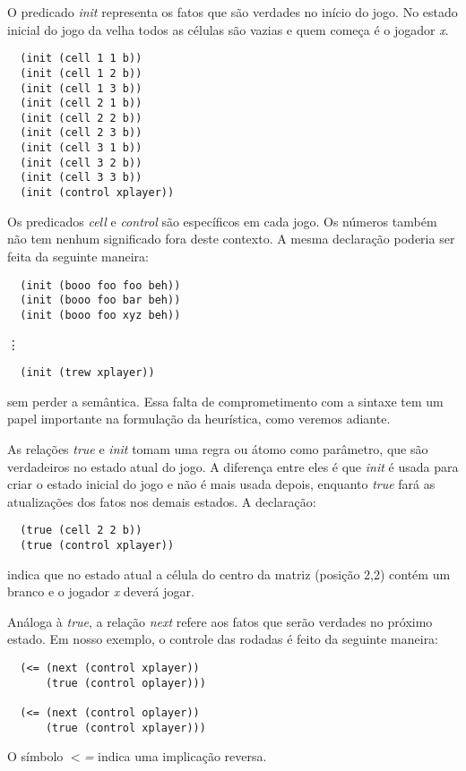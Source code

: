 O predicado {\it init} representa os fatos que são verdades no início do jogo.
No estado inicial do jogo da velha todos as células são vazias e quem começa é o
jogador {\it x}.
\begin{verbatim}
  (init (cell 1 1 b))
  (init (cell 1 2 b))
  (init (cell 1 3 b))
  (init (cell 2 1 b))
  (init (cell 2 2 b))
  (init (cell 2 3 b))
  (init (cell 3 1 b))
  (init (cell 3 2 b))
  (init (cell 3 3 b))
  (init (control xplayer))
\end{verbatim}
Os predicados {\it cell} e {\it control} são específicos em cada jogo. Os
números também não tem nenhum significado fora deste contexto. A mesma
declaração poderia ser feita da seguinte maneira:
\begin{verbatim}
  (init (booo foo foo beh))
  (init (booo foo bar beh))
  (init (booo foo xyz beh))
\end{verbatim}
\hspace{2cm} \vdots
\begin{verbatim}
  (init (trew xplayer))
\end{verbatim}
sem perder a semântica. Essa falta de comprometimento com a sintaxe tem um papel
importante na formulação da heurística, como veremos adiante.
 
As relações {\it true} e {\it init} tomam uma regra ou átomo como parâmetro, que
são verdadeiros no estado atual do jogo. A diferença entre eles é que {\it init}
é usada para criar o estado inicial do jogo e não é mais usada depois, enquanto
{\it true} fará as atualizações dos fatos nos demais estados. A declaração:

\begin{verbatim}
  (true (cell 2 2 b))
  (true (control xplayer))
\end{verbatim}
indica que no estado atual a célula do centro da matriz (posição 2,2) contém um
branco e o jogador {\it x} deverá jogar.
 
Análoga à {\it true}, a relação {\it next} refere aos fatos que serão verdades
no próximo estado. Em nosso exemplo, o controle das rodadas é feito da seguinte
maneira:
\begin{verbatim}
  (<= (next (control xplayer))
      (true (control oplayer)))
 
  (<= (next (control oplayer))
      (true (control xplayer)))
\end{verbatim}
O símbolo {\it $<$=} indica uma implicação reversa.
 
